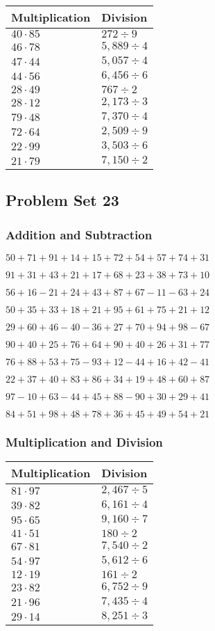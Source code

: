 \begin{longtable}[]{@{}ll@{}}
\toprule
Multiplication & Division\tabularnewline
\midrule
\endhead
\(40\cdot85\) & \(272 ÷9\)\tabularnewline
\(46\cdot78\) & \(5,889÷4\)\tabularnewline
\(47\cdot44\) & \(5,057÷4\)\tabularnewline
\(44\cdot56\) & \(6,456÷6\)\tabularnewline
\(28\cdot49\) & \(767÷2\)\tabularnewline
\(28\cdot12\) & \(2,173÷3\)\tabularnewline
\(79\cdot48\) & \(7,370÷4\)\tabularnewline
\(72\cdot64\) & \(2,509÷9\)\tabularnewline
\(22\cdot99\) & \(3,503÷6\)\tabularnewline
\(21\cdot79\) & \(7,150÷2\)\tabularnewline
\bottomrule
\end{longtable}

\hypertarget{problem-set-23-1}{%
\subsection{Problem Set 23}\label{problem-set-23-1}}

\hypertarget{addition-and-subtraction-63}{%
\subsubsection{Addition and
Subtraction}\label{addition-and-subtraction-63}}

\(50+71+91+14+15+72+54+57+74+ 31\)

\(91+31+43+21+17+68+23+38+73+10\)

\(56+16-21+24+43+87+67-11-63+24\)

\(50+35+33+18+21+95+61+75+21+12\)

\(29+60+46-40-36+27+70+94+98-67\)

\(90+40+25+76+64+90+40+26+31+77\)

\(76+88+53+75-93+12-44+16+42-41\)

\(22+37+40+83+86+34+19+48+60+87\)

\(97-10+63-44+45+88-90+30+29+41\)

\(84+51+98+48+78+36+45+49+54+21\)

\hypertarget{multiplication-and-division-63}{%
\subsubsection{Multiplication and
Division}\label{multiplication-and-division-63}}

\begin{longtable}[]{@{}ll@{}}
\toprule
Multiplication & Division\tabularnewline
\midrule
\endhead
\(81\cdot97\) & \(2,467÷5\)\tabularnewline
\(39\cdot82\) & \(6,161÷4\)\tabularnewline
\(95\cdot65\) & \(9,160÷7\)\tabularnewline
\(41\cdot51\) & \(180÷2\)\tabularnewline
\(67\cdot81\) & \(7,540÷2\)\tabularnewline
\(54\cdot97\) & \(5,612÷6\)\tabularnewline
\(12\cdot19\) & \(161÷2\)\tabularnewline
\(23\cdot82\) & \(6,752÷9\)\tabularnewline
\(21\cdot96\) & \(7,435÷4\)\tabularnewline
\(29\cdot14\) & \(8,251÷3\)\tabularnewline
\bottomrule
\end{longtable}

